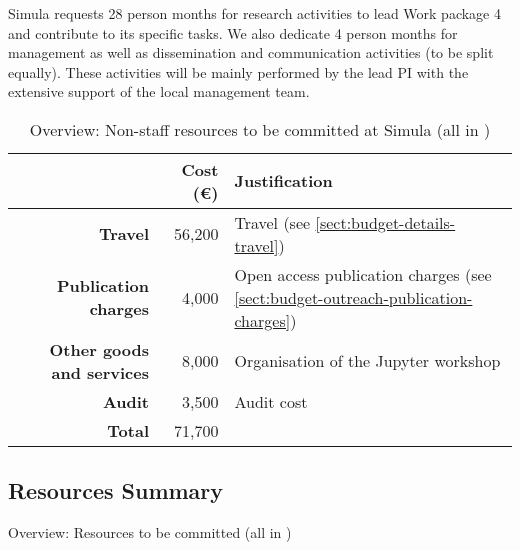 Simula requests 28 person months for research activities to lead Work package 4 and contribute to its specific tasks. 
We also dedicate 4 person months for management  as well as  dissemination and communication activities (to be split equally). These activities will be mainly performed by the lead PI with the extensive support of the local management team.  
\bigskip
\begin{table}[H]
\begin{tabular}{|r|r|p{9cm}|}
\hline
\textbf{} & \textbf{Cost (\euro)} & \textbf{Justification} \\\hline
\textbf{Travel} & 56,200 & Travel (see \ref{sect:budget-details-travel})\\\hline
\textbf{Publication charges} & 4,000 & Open access publication charges (see \ref{sect:budget-outreach-publication-charges})\\\hline

\textbf{Other goods and services} & 8,000 & Organisation of the Jupyter workshop  \\\hline   %
\textbf{Audit} & 3,500 & Audit cost \\\hline
\textbf{Total} & 71,700\\\cline{1-2}
\end{tabular}
\caption{Overview: Non-staff resources to be committed at Simula (all in \texteuro)}\vspace*{-1em}
\end{table}

\subsection{Resources Summary}

\begin{table}[ht]\centering
\caption{Overview: Resources to be committed (all in \texteuro)}\label{tab:resources}\vspace*{-1em}
\end{table}

